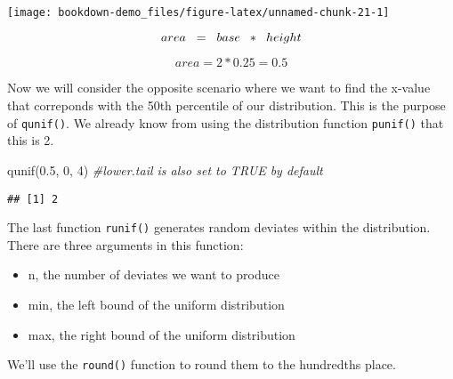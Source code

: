 \documentclass[
]{book}
\newenvironment{Shaded}{\begin{snugshade}}{\end{snugshade}}
\newcommand{\CommentTok}[1]{\textcolor[rgb]{0.56,0.35,0.01}{\textit{#1}}}
\newcommand{\DecValTok}[1]{\textcolor[rgb]{0.00,0.00,0.81}{#1}}
\newcommand{\FloatTok}[1]{\textcolor[rgb]{0.00,0.00,0.81}{#1}}
\newcommand{\FunctionTok}[1]{\textcolor[rgb]{0.00,0.00,0.00}{#1}}
\newcommand{\NormalTok}[1]{#1}
\begin{document}
\begin{center}\texttt{[image: bookdown-demo\_files/figure-latex/unnamed-chunk-21-1]} \end{center}

\[ area \hspace{0.2 cm}= \hspace{0.2 cm}base \hspace{0.2cm} * \hspace{0.2 cm}height\]

\[area = 2*0.25=0.5\]

Now we will consider the opposite scenario where we want to find the x-value that correponds with the 50th percentile of our distribution. This is the purpose of \texttt{qunif()}. We already know from using the distribution function \texttt{punif()} that this is 2.

\begin{Shaded}
\begin{Highlighting}[]
\FunctionTok{qunif}\NormalTok{(}\FloatTok{0.5}\NormalTok{, }\DecValTok{0}\NormalTok{, }\DecValTok{4}\NormalTok{) }\CommentTok{\#lower.tail is also set to TRUE by default}
\end{Highlighting}
\end{Shaded}

\begin{verbatim}
## [1] 2
\end{verbatim}

The last function \texttt{runif()} generates random deviates within the distribution. There are three arguments in this function:

\begin{itemize}
\item
  n, the number of deviates we want to produce
\item
  min, the left bound of the uniform distribution
\item
  max, the right bound of the uniform distribution
\end{itemize}

We'll use the \texttt{round()} function to round them to the hundredths place.
\end{document}
